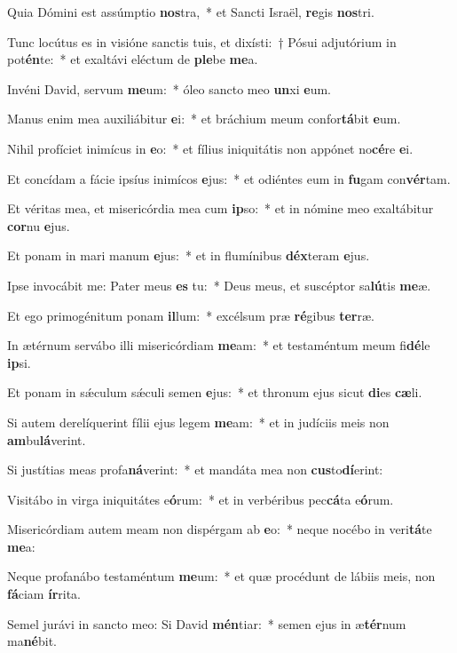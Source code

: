 \item Quia Dómini est assúmptio \textbf{nos}tra,~* et Sancti Israël, \textbf{re}gis \textbf{nos}tri.
\item Tunc locútus es in visióne sanctis tuis, et dixísti:~† Pósui adjutórium in pot\textbf{én}te:~* et exaltávi eléctum de \textbf{ple}be \textbf{me}a.
\item Invéni David, servum \textbf{me}um:~* óleo sancto meo \textbf{un}xi \textbf{e}um.
\item Manus enim mea auxiliábitur \textbf{e}i:~* et bráchium meum confor\textbf{tá}bit \textbf{e}um.
\item Nihil profíciet inimícus in \textbf{e}o:~* et fílius iniquitátis non appónet no\textbf{cé}re \textbf{e}i.
\item Et concídam a fácie ipsíus inimícos \textbf{e}jus:~* et odiéntes eum in \textbf{fu}gam con\textbf{vér}tam.
\item Et véritas mea, et misericórdia mea cum \textbf{ip}so:~* et in nómine meo exaltábitur \textbf{cor}nu \textbf{e}jus.
\item Et ponam in mari manum \textbf{e}jus:~* et in flumínibus \textbf{déx}teram \textbf{e}jus.
\item Ipse invocábit me: Pater meus \textbf{es} tu:~* Deus meus, et suscéptor sa\textbf{lú}tis \textbf{me}æ.
\item Et ego primogénitum ponam \textbf{il}lum:~* excélsum præ \textbf{ré}gibus \textbf{ter}ræ.
\item In ætérnum servábo illi misericórdiam \textbf{me}am:~* et testaméntum meum fi\textbf{dé}le \textbf{ip}si.
\item Et ponam in sǽculum sǽculi semen \textbf{e}jus:~* et thronum ejus sicut \textbf{di}es \textbf{cæ}li.
\item Si autem derelíquerint fílii ejus legem \textbf{me}am:~* et in judíciis meis non \textbf{am}bu\textbf{lá}verint.
\item Si justítias meas profa\textbf{ná}verint:~* et mandáta mea non \textbf{cus}to\textbf{dí}erint:
\item Visitábo in virga iniquitátes e\textbf{ó}rum:~* et in verbéribus pec\textbf{cá}ta e\textbf{ó}rum.
\item Misericórdiam autem meam non dispérgam ab \textbf{e}o:~* neque nocébo in veri\textbf{tá}te \textbf{me}a:
\item Neque profanábo testaméntum \textbf{me}um:~* et quæ procédunt de lábiis meis, non \textbf{fá}ciam \textbf{ír}rita.
\item Semel jurávi in sancto meo: Si David \textbf{mén}tiar:~* semen ejus in æ\textbf{tér}num ma\textbf{né}bit.
